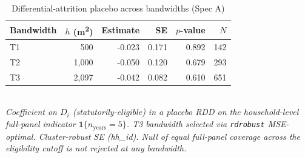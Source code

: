 \begin{table}[ht]
\centering
\caption{Differential-attrition placebo across bandwidths (Spec A)}
\label{tab:attrition-placebo-full}
\small
\begin{tabular}{lrrrrr}
\toprule
Bandwidth & $h$ (m\textsuperscript{2}) & Estimate & SE & $p$-value & $N$ \\
\midrule
T1 & 500 & -0.023 & 0.171 & 0.892 & 142 \\
T2 & 1,000 & -0.050 & 0.120 & 0.679 & 293 \\
T3 & 2,097 & -0.042 & 0.082 & 0.610 & 651 \\
\bottomrule
\end{tabular}
\\
\footnotesize\textit{Coefficient on $D_i$ (statutorily-eligible) in a placebo RDD on the household-level full-panel indicator $\mathbf{1}\{n_{\text{years}}=5\}$. T3 bandwidth selected via \texttt{rdrobust} MSE-optimal. Cluster-robust SE (hh\_id). Null of equal full-panel coverage across the eligibility cutoff is not rejected at any bandwidth.}
\end{table}

